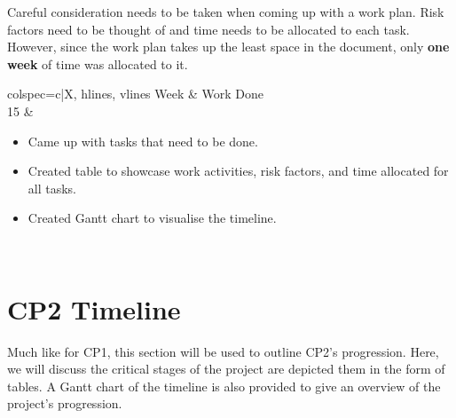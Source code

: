 \documentclass[a4paper, 12pt]{extreport}
\begin{document}
	Careful consideration needs to be taken when coming up with a work plan. Risk factors need to be thought of and time needs to be allocated to each task. However, since the work plan takes up the least space in the document, only \textbf{one week} of time was allocated to it.
	
	\begin{longtblr}[
		caption = Weekly breakdown of work done for Work Plan  Chapter.
		]{colspec={c|X}, hlines, vlines}
		Week & Work Done \\
		15 & \begin{varwidth}[t]{\linewidth}
			\begin{itemize}[topsep=0pt,parsep=0pt]
				\item Came up with tasks that need to be done.
				\item Created table to showcase work activities, risk factors, and time allocated for all tasks.
				\item Created Gantt chart to visualise the timeline.
			\end{itemize}
		\end{varwidth}\\
	\end{longtblr}
	
	\newpage
	\section{CP2 Timeline}
	
		Much like for CP1, this section will be used to outline CP2's progression. Here, we will discuss the critical stages of the project are depicted them in the form of tables. A Gantt chart of the timeline is also provided to give an overview of the project's progression.
		
\end{document}
